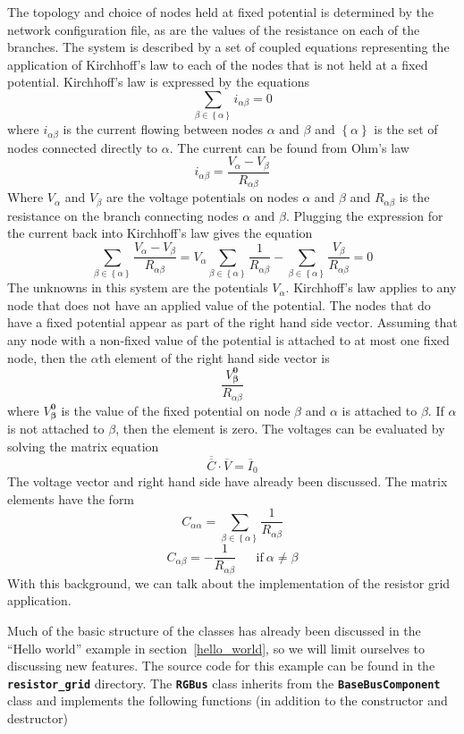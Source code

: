 The topology and choice of nodes held at fixed potential is determined by the
network configuration file, as are the values of the resistance on each of the
branches. The system is described by a set of coupled equations representing the
application of Kirchhoff's law to each of the nodes that is not held at a fixed
potential. Kirchhoff's law is expressed by the equations\[\sum_{\beta \in \left\{\alpha \right\}}{i_{\alpha \beta }=0}\] 
where $i_{\alpha \beta }$ is the current flowing between nodes $\alpha $ and
$\beta $ and $\left\{\alpha \right\}$ is the set of nodes connected directly to
$\alpha $. The current can be found from Ohm's law
\[i_{\alpha \beta }=\frac{V_{\alpha }-V_{\beta }}{R_{\alpha \beta }}\] 
Where $V_{\alpha }$ and $V_{\beta }$ are the voltage potentials on nodes $\alpha
$ and $\beta $ and $R_{\alpha \beta }$ is the resistance on the branch
connecting nodes $\alpha $ and $\beta $. Plugging the expression for the current
back into Kirchhoff's law gives the equation
\[\sum_{\beta \in \left\{\alpha \right\}}{\frac{V_{\alpha }-V_{\beta }}{R_{\alpha \beta }}=V_{\alpha }\sum_{\beta \in \left\{\alpha \right\}}{\frac{1}{R_{\alpha \beta }}}-\sum_{\beta \in \left\{\alpha \right\}}{\frac{V_{\beta }}{R_{\alpha \beta }}}=0}\] 
The unknowns in this system are the potentials $V_{\alpha }$. Kirchhoff's law applies to any node that does not have an applied value of the potential. The nodes that do have a fixed potential appear as part of the right hand side vector. Assuming that any node with a non-fixed value of the potential is attached to at most one fixed node, then the $\alpha $th element of the right hand side vector is
\[\frac{V^{\boldsymbol{0}}_{\boldsymbol{\beta }}}{R_{\alpha \beta }}\] 
where $V^{\boldsymbol{0}}_{\boldsymbol{\beta }}$ is the value of the fixed potential on node $\beta $ and $\alpha $ is attached to $\beta $. If $\alpha $ is not attached to $\beta $, then the element is zero. The voltages can be evaluated by solving the matrix equation
\[\overline{\overline{C}}\cdot \overline{V}={\overline{I}}_0\] 
The voltage vector and right hand side have already been discussed. The matrix elements have the form
\[
C_{\alpha \alpha }=\sum_{\beta \in \left\{\alpha \right\}}{\frac{1}{R_{\alpha \beta }}}
\]
\[
C_{\alpha \beta }=-\frac{1}{R_{\alpha \beta }}\ \mathrm{\;\;\;\;\;if}\ \alpha \neq \beta
\] 
With this background, we can talk about the implementation of the resistor grid application.

Much of the basic structure of the classes has already been discussed in
the ``Hello world'' example in section~\ref{hello_world}, so we will limit ourselves to discussing new features. The source code for this example can be found in the \texttt{\textbf{resistor\_grid}} directory. The \texttt{\textbf{RGBus}} class inherits from the \texttt{\textbf{BaseBusComponent}} class and implements the following functions (in addition to the constructor and destructor)

